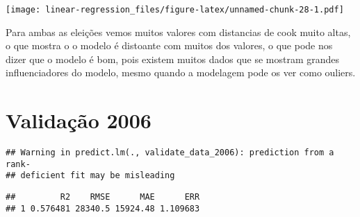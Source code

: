 \documentclass[]{article}
\newenvironment{Shaded}{\begin{snugshade}}{\end{snugshade}}
\newcommand{\KeywordTok}[1]{\textcolor[rgb]{0.13,0.29,0.53}{\textbf{#1}}}
\newcommand{\DataTypeTok}[1]{\textcolor[rgb]{0.13,0.29,0.53}{#1}}
\newcommand{\DecValTok}[1]{\textcolor[rgb]{0.00,0.00,0.81}{#1}}
\newcommand{\StringTok}[1]{\textcolor[rgb]{0.31,0.60,0.02}{#1}}
\newcommand{\OperatorTok}[1]{\textcolor[rgb]{0.81,0.36,0.00}{\textbf{#1}}}
\newcommand{\NormalTok}[1]{#1}
\begin{document}
\texttt{[image: linear-regression\_files/figure-latex/unnamed-chunk-28-1.pdf]}

Para ambas as eleições vemos muitos valores com distancias de cook muito
altas, o que mostra o o modelo é distoante com muitos dos valores, o que
pode nos dizer que o modelo é bom, pois existem muitos dados que se
mostram grandes influenciadores do modelo, mesmo quando a modelagem pode
os ver como ouliers.

\section{Validação 2006}\label{validacao-2006}

\begin{Shaded}
\end{Shaded}

\begin{verbatim}
## Warning in predict.lm(., validate_data_2006): prediction from a rank-
## deficient fit may be misleading
\end{verbatim}

\begin{Shaded}
\end{Shaded}

\begin{verbatim}
##         R2    RMSE      MAE      ERR
## 1 0.576481 28340.5 15924.48 1.109683
\end{verbatim}
\end{document}
